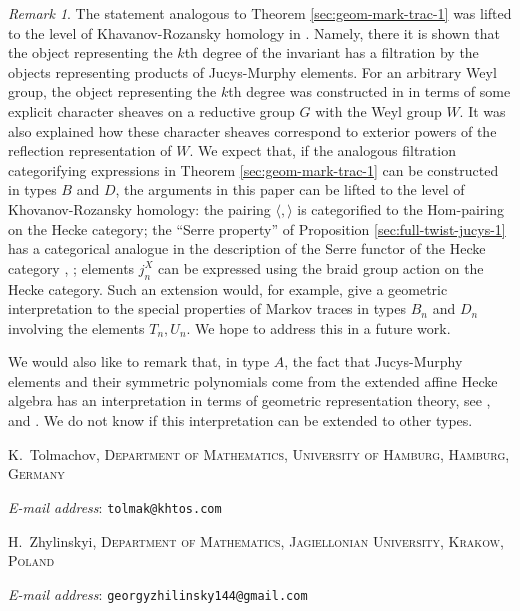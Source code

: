 \documentclass[11pt,leqno]{article}
\makeatletter
\theoremstyle{definition}
\theoremstyle{definition}
\theoremstyle{remark}
\newtheorem{remark}[theorem]{Remark}%
\newcommand{\Addresses}{{%
  \bigskip
  \footnotesize
  K.~Tolmachov, \textsc{Department of Mathematics, University of Hamburg,
    Hamburg, Germany}\par\nopagebreak
  \textit{E-mail address}: \texttt{tolmak@khtos.com}

  \medskip

   H.~Zhylinskyi, \textsc{Department of Mathematics, Jagiellonian University, Krakow, Poland}\par\nopagebreak
  \textit{E-mail address}: \texttt{georgyzhilinsky144@gmail.com}
}}
\makeatother
\begin{document}
\begin{remark}
  The statement analogous to Theorem \ref{sec:geom-mark-trac-1} was lifted to the level of Khavanov-Rozansky homology in \cite{bezrukavnikovMonodromicModelKhovanov2022}. Namely, there it is shown that the object representing the $k$th degree of the invariant has a filtration by the objects representing products of Jucys-Murphy elements. For an arbitrary Weyl group, the object representing the $k$th degree was constructed in \cite{bezrukavnikovMonodromicModelKhovanov2022} in terms of some explicit character sheaves on a reductive group $G$ with the Weyl group $W$. It was also explained how these character sheaves correspond to exterior powers of the reflection representation of $W$. We expect that, if the analogous filtration categorifying expressions in Theorem \ref{sec:geom-mark-trac-1} can be constructed in types $B$ and $D$, the arguments in this paper can be lifted to the level of Khovanov-Rozansky homology: the pairing $\langle, \rangle$ is categorified to the $\mathrm{Hom}$-pairing on the Hecke category; the ``Serre property'' of Proposition \ref{sec:full-twist-jucys-1} has a categorical analogue in the description of the Serre functor of the Hecke category \cite{beilinsonTiltingExercises2004}, \cite{gorskySerreDualityKhovanov2019}; elements $j_n^X$ can be expressed using the braid group action on the Hecke category. Such an extension would, for example, give a geometric interpretation to the special properties of Markov traces in types $B_n$ and $D_n$ involving the elements $T_n, U_n$. We hope to address this in a future work.

  We would also like to  remark that, in type $A$, the fact that Jucys-Murphy elements and their symmetric polynomials come from the extended affine Hecke algebra has an interpretation in terms of geometric representation theory, see \cite{gnr}, \cite{oblomkovAFFINEBRAIDGROUP2019} and \cite{tolmachovkostiantynLinearStructureFinite}. We do not know if this interpretation can be extended to other types. 
\end{remark}




\Addresses
\end{document}
